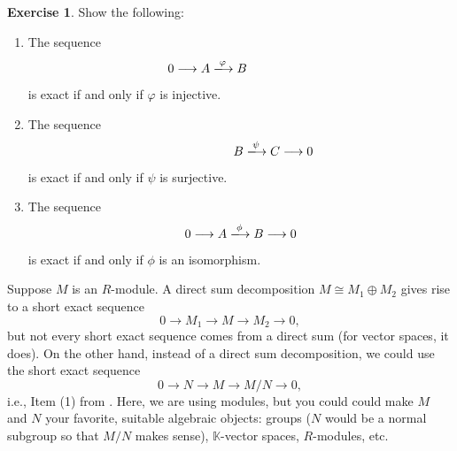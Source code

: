 \documentclass[12pt,a4paper]{article}
\newcommand{\KK}{\mathbb{K}}
\theoremstyle{definition}
\newtheorem{exercise}[theorem]{Exercise}
\numberwithin{equation}{section}
\begin{document}

\begin{exercise}
    Show the following:
    \begin{enumerate}[label=(\alph*)]
        \item The sequence
        \begin{equation*}
            0 \longrightarrow A \xlongrightarrow[]{\varphi} B \phantom{\xlongrightarrow[]{\psi} C \longrightarrow 0}
        \end{equation*}
        is exact if and only if $\varphi$ is injective.

        \item The sequence
        \begin{equation*}
            \phantom{0 \longrightarrow A \xlongrightarrow[]{\varphi}} B \xlongrightarrow[]{\psi} C \longrightarrow 0
        \end{equation*}
        is exact if and only if $\psi$ is surjective.

        \item The sequence
        \begin{equation*}
            0 \longrightarrow A \xlongrightarrow[]{\phi} B \longrightarrow 0
        \end{equation*}
        is exact if and only if $\phi$ is an isomorphism.
    \end{enumerate}
\end{exercise}

Suppose $M$ is an $R$-module.
A direct sum decomposition $M \cong M_1 \oplus M_2$ gives rise to a short exact sequence
\begin{equation*}
    0 \longrightarrow M_1 \longrightarrow M \longrightarrow M_2 \longrightarrow 0,
\end{equation*}
but not every short exact sequence comes from a direct sum (for vector spaces, it does).
On the other hand, instead of a direct sum decomposition, we could use the short exact sequence
\begin{equation*}
    0 \longrightarrow N \longrightarrow M \longrightarrow M/N \longrightarrow 0,
\end{equation*}
i.e., Item (1) from .
Here, we are using modules, but you could could make $M$ and $N$ your favorite, suitable algebraic objects: groups ($N$ would be a normal subgroup so that $M/N$ makes sense), $\KK$-vector spaces, $R$-modules, etc.
\end{document}
